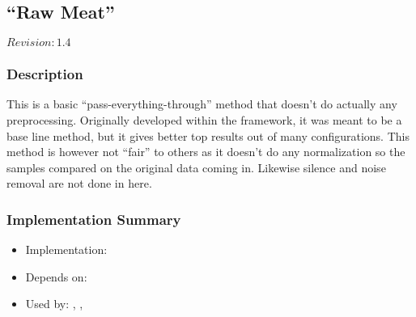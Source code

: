 \subsection{``Raw Meat''}

$Revision: 1.4 $

\subsubsection{Description}

This is a basic ``pass-everything-through'' method that doesn't
do actually any preprocessing. Originally developed within the
framework, it was meant to be a base line method, but it gives
better top results out of many configurations. This method
is however not ``fair'' to others as it doesn't do any normalization
so the samples compared on the original data coming in. Likewise
silence and noise removal are not done in here.

\subsubsection{Implementation Summary}

\begin{itemize}
\item Implementation: 
\item Depends on: 
\item Used by: , , 
\end{itemize}



